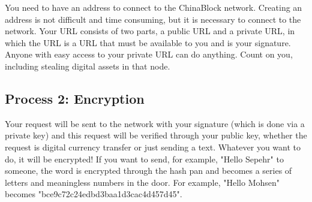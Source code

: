You need to have an address to connect to the ChinaBlock network. Creating an address is not difficult and time consuming, but it is necessary to connect to the network. Your URL consists of two parts, a public URL and a private URL, in which the URL is a URL that must be available to you and is your signature. Anyone with easy access to your private URL can do anything. Count on you, including stealing digital assets in that node.

\subsection{Process 2: Encryption}
Your request will be sent to the network with your signature (which is done via a private key) and this request will be verified through your public key, whether the request is digital currency transfer or just sending a text.
Whatever you want to do, it will be encrypted! If you want to send, for example, "Hello Sepehr" to someone, the word is encrypted through the hash pan and becomes a series of letters and meaningless numbers in the door. For example, "Hello Mohsen" becomes "bce9c72c24edbd3baa1d3cac4d457d45".
\newline

